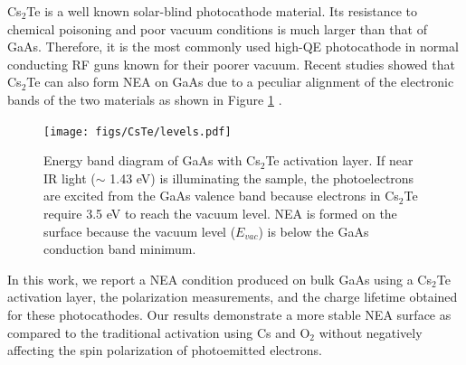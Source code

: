 Cs$_2$Te is a well known solar-blind photocathode material. Its resistance to chemical poisoning and poor vacuum conditions is much larger than that of GaAs. Therefore, it is the most commonly used high-QE photocathode in normal conducting RF guns known for their poorer vacuum.\cite{michelato2008_Cs2TePHOTOCATHODESROBUSTNESS}
Recent studies showed that Cs$_2$Te can also form NEA on GaAs due to a peculiar alignment of the electronic bands of the two materials as shown in Figure \ref{levels} \cite{kuriki2015_GaAsPhotocathodeActivation,sugiyama2011_StudyElectronAffinity,uchida2014_STUDYROBUSTNESSNEAGAAS}.
\begin{figure}
    \centering
    \texttt{[image: figs/CsTe/levels.pdf]}
    \caption{Energy band diagram of GaAs with Cs$_2$Te activation layer. If near IR light ($\sim$ 1.43 eV) is illuminating the sample, the photoelectrons are excited from the GaAs valence band because electrons in Cs$_2$Te require 3.5 eV to reach the vacuum level. NEA is formed on the surface because the vacuum level ($E_{vac}$) is below the GaAs conduction band minimum.}
    \label{levels}
\end{figure}

In this work, we report a NEA condition produced on bulk GaAs using a Cs$_2$Te activation layer, the polarization measurements, and the charge lifetime obtained for these photocathodes. Our results demonstrate a more stable NEA surface as compared to the traditional activation using Cs and O$_2$ without negatively affecting the spin polarization of photoemitted electrons.


